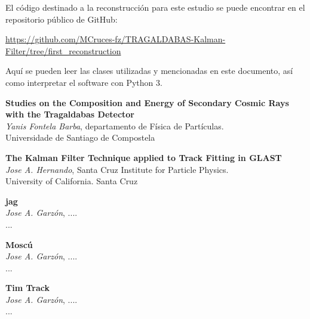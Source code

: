 \documentclass[a4paper]{article}
\begin{document}
El código destinado a la reconstrucción para este estudio se puede encontrar en el repositorio público de GitHub:

\url{https://github.com/MCruces-fz/TRAGALDABAS-Kalman-Filter/tree/first_reconstruction}

Aquí se pueden leer las clases utilizadas y mencionadas en este documento, así como interpretar el software con \textsf{Python 3}.


\begin{thebibliography}{9}
    \textbf{Studies on the Composition and Energy of Secondary Cosmic Rays with the Tragaldabas Detector}\\
    \textit{Yanis Fontela Barba}, departamento de Física de Partículas.\\
    \textsf{Universidade de Santiago de Compostela}

    \textbf{The Kalman Filter Technique applied to Track Fitting in GLAST}\\
    \textit{Jose A. Hernando}, Santa Cruz Institute for Particle Physics.\\
    \textsf{University of California. Santa Cruz}

    \textbf{jag}\\
    \textit{Jose A. Garzón}, ....\\
    \textsf{...}

    \textbf{Moscú}\\
    \textit{Jose A. Garzón}, ....\\
    \textsf{...}

    \textbf{Tim Track}\\
    \textit{Jose A. Garzón}, ....\\
    \textsf{...}
\end{thebibliography}
\end{document}
